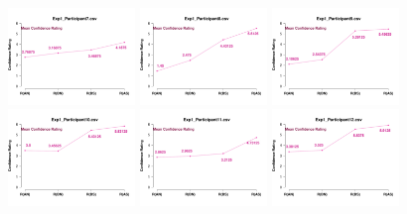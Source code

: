 \begin{figure}[th]
\includegraphics[width=0.30\textwidth]{Figures/MirrorRating_Exp1_P7} \includegraphics[width=0.30\textwidth]{Figures/MirrorRating_Exp1_P8} \includegraphics[width=0.30\textwidth]{Figures/MirrorRating_Exp1_P9}
\includegraphics[width=0.30\textwidth]{Figures/MirrorRating_Exp1_P10} \includegraphics[width=0.30\textwidth]{Figures/MirrorRating_Exp1_P11} \includegraphics[width=0.30\textwidth]{Figures/MirrorRating_Exp1_P12}

\end{figure}
